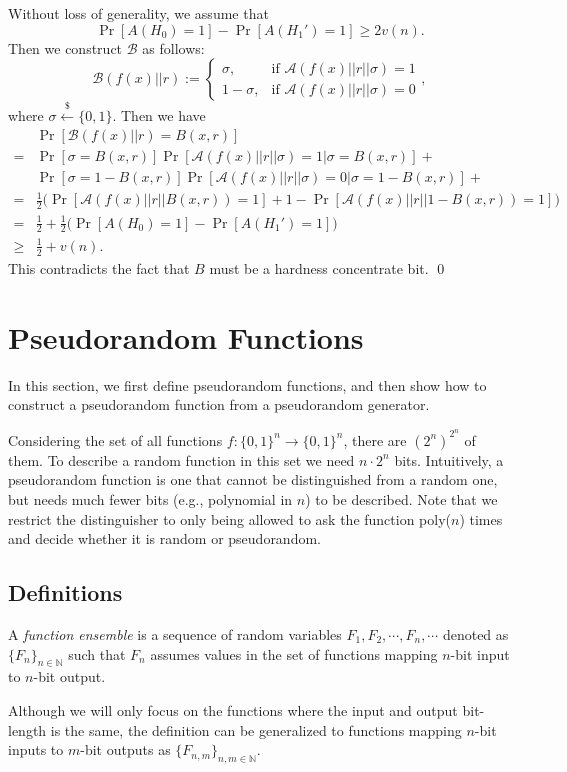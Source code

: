 \documentclass[12pt]{tufte-book}
\newcommand{\ma}{\mathcal{A}}
\begin{document}
Without loss of generality, we assume that
\[
\Pr[A(H_0) = 1] - \Pr[A(H_1') = 1]
\geq 2v(n).
\]
Then we construct $\mathcal{B}$ as follows:
\[
\mathcal{B}(f(x)|| r) :=
\begin{cases}
\sigma, & \text{if } \ma(f(x)|| r||\sigma) = 1\\
1 - \sigma, & \text{if } \ma(f(x)||r|| \sigma) = 0
\end{cases},
\]
where $\sigma \xleftarrow{\$} \{0, 1\}$.
Then we have
\begin{align*}
& \Pr[\mathcal{B}(f(x)|| r) = B(x, r)]\\
=& \Pr[\sigma = B(x, r)] \Pr[ \ma(f(x)|| r||\sigma)=1 | \sigma = B(x, r)] + \\
& \Pr[\sigma = 1 - B(x, r)] \Pr[ \ma(f(x)|| r||\sigma) = 0 | \sigma = 1- B(x, r)] + \\
=& \frac{1}{2} \big( \Pr[\ma(f(x)||r||B(x, r)) = 1] + 1 - \Pr[\ma(f(x)|| r|| 1- B(x, r)) = 1] \big)\\
=& \frac{1}{2} + \frac{1}{2} \big( \Pr[A(H_0) = 1] - \Pr[A(H_1') = 1] \big)\\
\geq & \frac{1}{2} + v(n).
\end{align*}
This contradicts the fact that $B$ must be a hardness concentrate bit.
\qed

 \section{Pseudorandom Functions}
In this section, we first define pseudorandom functions, and then show how to  construct a pseudorandom function from a pseudorandom generator.

Considering the set of all functions $f: \{0, 1\}^n \rightarrow \{0, 1\}^n$, there are $(2^n)^{2^n}$ of them.
To describe a random function in this set we need $n \cdot 2^n$ bits.
Intuitively, a pseudorandom function is one that cannot be distinguished from a random one,
but needs much fewer bits (e.g., polynomial in $n$) to be described.
Note that we restrict the distinguisher to only being allowed to ask the function poly($n$) times and decide whether it is random or pseudorandom.

\subsection{Definitions}

\begin{definition}
    A \emph{function ensemble} is a sequence of random variables $F_1, F_2, \cdots, F_n, \cdots$ denoted as $\{F_n\}_{n \in \mathbb{N}}$ such that
    $F_n$ assumes values in the set of functions mapping $n$-bit input to $n$-bit output.
\end{definition}
Although we will only focus on the functions where the input and output bit-length is the same, the definition can be generalized to functions mapping $n$-bit inputs to $m$-bit outputs as $\{F_{n, m}\}_{n, m \in \mathbb{N}}$.
\end{document}
